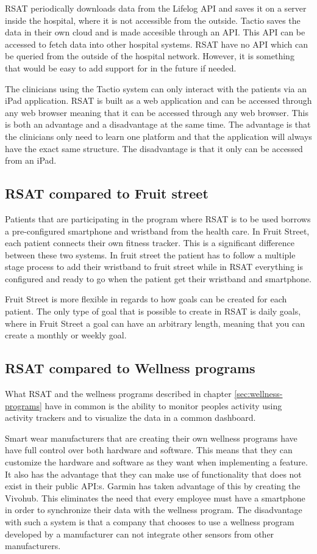 \documentclass{cslthse-msc}
\begin{document}
RSAT periodically downloads data from the Lifelog API and saves it on a server inside the hospital, where it is not accessible from the outside. Tactio saves the data in their own cloud and is made accesible through an API. This API can be accessed to fetch data into other hospital systems. RSAT have no API which can be queried from the outside of the hospital network. However, it is something that would be easy to add support for in the future if needed.  

The  clinicians using the Tactio system can only interact with the patients via an iPad application. RSAT is built as a web application and can be accessed through any web browser meaning that it can be accessed through any web browser. This is both an advantage and a disadvantage at the same time. The advantage is that the clinicians only need to learn one platform and that the application will always have the exact same structure. The disadvantage is that it only can be accessed from an iPad.


\subsection{RSAT compared to Fruit street}

Patients that are participating in the program where RSAT is to be used borrows a pre-configured smartphone and wristband from the health care. In Fruit Street, each patient connects their own fitness tracker. This is a significant difference between these two systems. In fruit street the patient has to follow a multiple stage process to add their wristband to fruit street  while in RSAT everything is configured and ready to go when the patient get their wristband and smartphone. 

Fruit Street is more flexible in regards to how goals can be created for each patient. The only type of goal that is possible to create in RSAT is daily goals, where in Fruit Street a goal can have an arbitrary length, meaning that you can create a monthly or weekly goal. 


\subsection{RSAT compared to Wellness programs}
What RSAT and the wellness programs described in chapter \ref{sec:wellness-programs} have in common is the ability to monitor peoples activity using activity trackers and to visualize the data in a common dashboard. 

Smart wear manufacturers that are creating their own wellness programs have have full control over both hardware and software. This means that they can customize the hardware and software as they want when implementing a feature. It also has the advantage that they can make use of functionality that does not exist in their public API:s. Garmin has taken advantage of this by creating the Vivohub. This eliminates the need that every employee must have a smartphone in order to synchronize their data with the wellness program. The disadvantage with such a system is that a company that chooses to use a wellness program developed by a manufacturer can not integrate other sensors from other manufacturers. 
\end{document}
